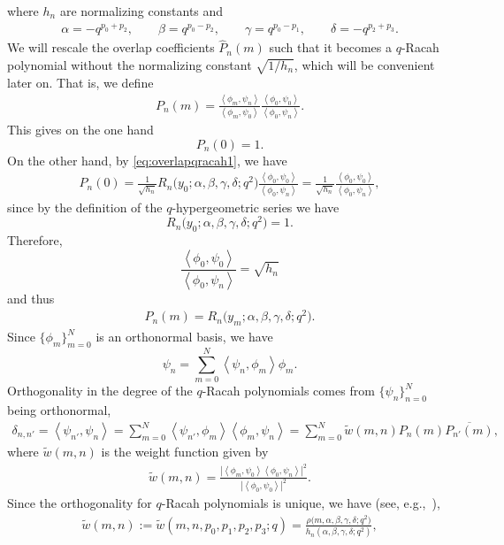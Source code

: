 \documentclass[pdftex]{sigma}
\numberwithin{equation}{section}
\newcommand{\inprod}[2]{\left\langle #1, #2 \right\rangle}
\begin{document}
where $h_n$ are normalizing constants and
\begin{gather}
	\alpha=-q^{p_0+p_2},\qquad \beta=q^{p_0-p_2},\qquad \gamma=q^{p_0-p_1},\qquad \delta=-q^{p_2+p_3}. \label{eq:qracahpar}
\end{gather}
We will rescale the overlap coefficients $\widehat{P}_n(m)$ such that it becomes a $q$-Racah polynomial without the normalizing constant $\sqrt{1/h_n}$, which will be convenient later on. That is, we define
\begin{gather}
	P_n(m)=\frac{\inprod{\phi_m}{\psi_n}}{\inprod{\phi_m}{\psi_0}} \frac{\inprod{\phi_0}{\psi_0}}{\inprod{\phi_0}{\psi_n}}.\label{eq:overlap}
\end{gather}
This gives on the one hand
\[
P_n(0)=1.
\]
On the other hand, by \eqref{eq:overlapqracah1}, we have
\begin{gather*}
P_n(0)=\frac{1}{\sqrt{h_n}} R_n\big(y_0;\alpha,\beta,\gamma,\delta;q^2\big)\frac{\inprod{\phi_0}{\psi_0}}{\inprod{\phi_0}{\psi_n}}= \frac{1}{\sqrt{h_n}} \frac{\inprod{\phi_0}{\psi_0}}{\inprod{\phi_0}{\psi_n}},
\end{gather*}
since by the definition of the $q$-hypergeometric series we have
\[
R_n\big(y_0;\alpha,\beta,\gamma,\delta;q^2\big)=1.
\]
Therefore,
\[
\frac{\inprod{\phi_0}{\psi_0}}{\inprod{\phi_0}{\psi_n}} = \sqrt{h_n}
\]
and thus
\begin{gather*}
	P_n(m)=R_n\big(y_m;\alpha,\beta,\gamma,\delta;q^2\big). %
\end{gather*}
Since $\{\phi_m\}_{m=0}^N$ is an orthonormal basis, we have
\[
\psi_n=\sum_{m=0}^N\inprod{\psi_n}{\phi_m}\phi_m.
\]
Orthogonality in the degree of the $q$-Racah polynomials comes from $\{\psi_n\}_{n=0}^N$ being orthonormal,
\begin{gather}
	\delta_{n,n'}=\inprod{\psi_{n'}}{\psi_n}=\sum_{m=0}^N \inprod{\psi_{n'}}{\phi_m}\inprod{\phi_m}{\psi_n} = \sum_{m=0}^N \tilde{w}(m,n)P_n(m)\overline{P_{n'}(m)},\label{eq:orthogonalityqracah}
\end{gather}
where $\tilde{w}(m,n)$ is the weight function given by
\begin{gather*}%
	\tilde{w}(m,n)=\frac{|\inprod{\phi_m}{\psi_0}\inprod{\phi_0}{\psi_n}|^2}{|\inprod{\phi_0}{\psi_0}|^2}.
\end{gather*}
Since the orthogonality for $q$-Racah polynomials is unique, we have (see, e.g.,~\cite{KLS}),
\begin{gather}
	\tilde{w}(m,n):=\tilde{w}(m,n,p_0,p_1,p_2,p_3;q)=\frac{\rho\big(m,\alpha,\beta,\gamma,\delta;q^2\big)}{h_n(\alpha,\beta,\gamma,\delta;q^2)},\label{eq:weighttilde}
\end{gather}
\end{document}
